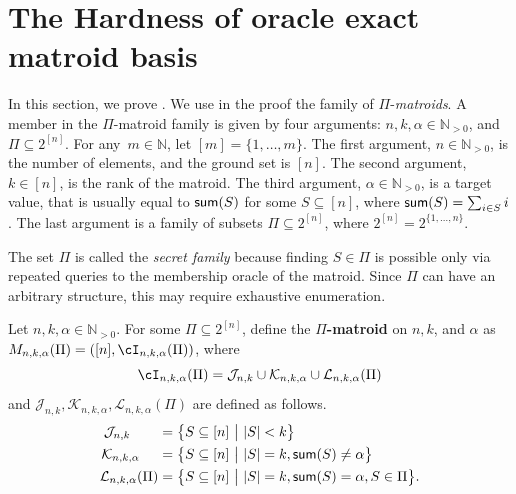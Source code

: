 \section{The Hardness of {\sc oracle exact matroid basis}}
\label{sec:technical}
\label{sec:Pi}
In this section, we prove . We use in the proof the family of $\Pi$-{\em matroids}. A member in the $\Pi$-matroid family is given by four arguments: $n,k,\alpha \in \mathbb{N}_{>0}$, and $\Pi \subseteq 2^{[n]}$. For any~$m\in \mathbb{N}$, let $[m]=\{1,\ldots, m\}$.
 The first argument, $n \in \mathbb{N}_{>0}$, is the number of elements, and the ground set is $[n]$. The second argument, $k \in [n]$, is the rank of the matroid. 
 The third argument, $\alpha\in \mathbb{N}_{>0}$, is a target value, that is usually equal to $\textnormal{\textsf{sum}}(S)$ for some $S \subseteq [n]$, where $\textnormal{\textsf{sum}}(S) = \sum_{i \in S} i$. The last argument is a family of subsets $\Pi \subseteq 2^{[n]}$, where $2^{[n]} = 2^{\{1,\ldots,n\}}$.


The set $\Pi$ is called the {\em secret family} because finding $S\in \Pi$ is possible only via repeated queries to the membership oracle of the matroid. Since $\Pi$ can have an arbitrary structure, this may require exhaustive enumeration.


\begin{definition}
	\label{def:Matroid}
	Let $n,k,\alpha \in \mathbb{N}_{>0}$. For some $\Pi \subseteq 2^{[n]}$, define the {\bf $\Pi$-matroid} on $n,k$, and $\alpha$ as $M_{n,k,\alpha}(\Pi) = ([n],\cI_{n,k,\alpha}(\Pi))$, where $$\cI_{n,k,\alpha}(\Pi) = \mathcal{J}_{n,k} \cup \mathcal{K}_{n,k,\alpha} \cup \mathcal{L}_{n,k,\alpha}(\Pi)$$ and $\mathcal{J}_{n,k}, \mathcal{K}_{n,k,\alpha}, \mathcal{L}_{n,k,\alpha}(\Pi)$ are defined as follows. \begin{equation}
		\label{eq:1}
		\begin{aligned}
			\mathcal{J}_{n,k}~~~~~~ = {} & \big\{S \subseteq [n]~\big|~ |S| < k\big\} \\
			\mathcal{K}_{n,k,\alpha}~~~~ = {} & \big\{S \subseteq [n]~\big|~ |S| = k, \textnormal{\textsf{sum}}(S) \neq \alpha\big\} \\
			\mathcal{L}_{n,k,\alpha}(\Pi) = {} & \big\{S \subseteq [n]~\big|~ |S| = k, \textnormal{\textsf{sum}}(S) = \alpha, S \in \Pi\big\}. \\
		\end{aligned}
	\end{equation}
\end{definition} 

